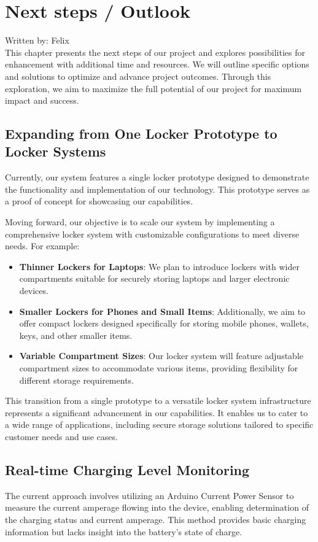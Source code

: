\section{Next steps / Outlook}
{\tiny Written by: Felix}\\ 

This chapter presents the next steps of our project and explores possibilities 
for enhancement with additional time and resources. 
We will outline specific options and solutions to optimize and advance project outcomes. 
Through this exploration, we aim to maximize the full potential of our project 
for maximum impact and success.

\subsection{Expanding from One Locker Prototype to Locker Systems}

Currently, our system features a single locker prototype designed to demonstrate the functionality and implementation of our technology. This prototype serves as a proof of concept for showcasing our capabilities.

Moving forward, our objective is to scale our system by implementing a comprehensive locker system with customizable configurations to meet diverse needs. For example:

\begin{itemize}
    \item \textbf{Thinner Lockers for Laptops}: We plan to introduce lockers with wider compartments suitable for securely storing laptops and larger electronic devices.
    \item \textbf{Smaller Lockers for Phones and Small Items}: Additionally, we aim to offer compact lockers designed specifically for storing mobile phones, wallets, keys, and other smaller items.
    \item \textbf{Variable Compartment Sizes}: Our locker system will feature adjustable compartment sizes to accommodate various items, providing flexibility for different storage requirements.
\end{itemize}

This transition from a single prototype to a versatile locker system infrastructure represents a significant advancement in our capabilities. It enables us to cater to a wide range of applications, including secure storage solutions tailored to specific customer needs and use cases.


\subsection{Real-time Charging Level Monitoring}
The current approach involves utilizing an Arduino Current Power Sensor to measure the
current amperage flowing into the device, 
enabling determination of the charging status and current amperage. 
This method provides basic charging information but lacks insight into the battery's state of charge.


